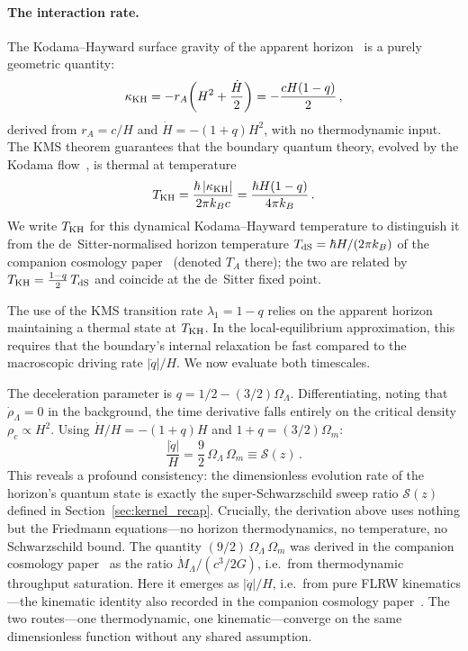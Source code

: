 \documentclass[aps,prd,twocolumn,10pt,superscriptaddress,nofootinbib]{revtex4-2}
\begin{document}
\paragraph{The interaction rate.}

The Kodama--Hayward surface gravity of the apparent
horizon~\cite{Hayward1998} is a purely geometric quantity:
\begin{equation}
\kappa_{\rm KH}
  = -r_A\!\left(H^2 + \frac{\dot{H}}{2}\right)
  = -\frac{cH(1-q)}{2}\,,
\label{eq:kappa_KH_kms}
\end{equation}
derived from $r_A = c/H$ and $\dot{H} = -(1+q)H^2$, with no
thermodynamic input.  The KMS theorem guarantees that the boundary
quantum theory, evolved by the Kodama flow~\cite{Kodama1980}, is thermal at
temperature
\begin{equation}
T_{\rm KH} = \frac{\hbar\,|\kappa_{\rm KH}|}{2\pi k_B c}
  = \frac{\hbar H(1-q)}{4\pi k_B}\,.
\label{eq:TA_KMS}
\end{equation}
We write $T_{\rm KH}$ for this dynamical Kodama--Hayward
temperature to distinguish it from the de~Sitter-normalised
horizon temperature $T_{\rm dS} = \hbar H/(2\pi k_B)$ of
the companion cosmology paper~\cite{Sayegh2026} (denoted $T_A$ there); the two are
related by $T_{\rm KH} = \tfrac{1-q}{2}\,T_{\rm dS}$ and coincide
at the de~Sitter fixed point.

The use of the KMS transition rate $\lambda_1 = 1-q$ relies on
the apparent horizon maintaining a thermal state at $T_{\rm KH}$.
In the local-equilibrium approximation, this requires that the
boundary's internal relaxation be fast compared to the macroscopic
driving rate $|\dot{q}|/H$.  We now evaluate both timescales.

The deceleration parameter is $q = 1/2 - (3/2)\Omega_\Lambda$.
Differentiating, noting that $\dot{\rho}_\Lambda = 0$ in the
background, the time derivative falls entirely on the critical
density $\rho_c \propto H^2$.  Using $\dot{H}/H = -(1+q)H$ and
$1 + q = (3/2)\Omega_m$:
\begin{equation}
\frac{|\dot{q}|}{H}
  = \frac{9}{2}\,\Omega_\Lambda\,\Omega_m
  \equiv \mathcal{S}(z)\,.
\label{eq:qdot_sweep}
\end{equation}
This reveals a profound consistency: the dimensionless evolution
rate of the horizon's quantum state is exactly the
super-Schwarzschild sweep ratio $\mathcal{S}(z)$ defined in
Section~\ref{sec:kernel_recap}.  Crucially, the derivation above
uses nothing but the Friedmann equations---no horizon
thermodynamics, no temperature, no Schwarzschild bound.  The
quantity $(9/2)\,\Omega_\Lambda\,\Omega_m$ was derived in
the companion cosmology paper~\cite{Sayegh2026} as the ratio
$\dot{M}_\Lambda/(c^3/2G)$, i.e.\ from thermodynamic throughput
saturation.  Here it emerges as $|\dot{q}|/H$,
i.e.\ from pure FLRW kinematics---the kinematic identity also
recorded in the companion cosmology paper~\cite{Sayegh2026}.  The two routes---one
thermodynamic, one kinematic---converge on the same dimensionless
function without any shared assumption.
\end{document}
